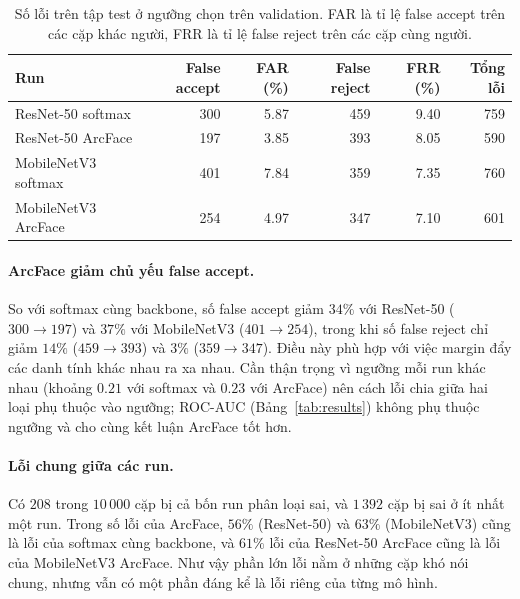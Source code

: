 \documentclass[a4paper,12pt]{article}
\begin{document}
\begin{table}[h]
    \centering
    \caption{Số lỗi trên tập test ở ngưỡng chọn trên validation. FAR là tỉ lệ false accept trên các cặp khác người, FRR là tỉ lệ false reject trên các cặp cùng người.}
    \label{tab:errors}
    \begin{tabular}{lrrrrr}
        \toprule
        Run                 & False accept & FAR (\%) & False reject & FRR (\%) & Tổng lỗi \\
        \midrule
        ResNet-50 softmax   & 300          & 5.87     & 459          & 9.40     & 759      \\
        ResNet-50 ArcFace   & 197          & 3.85     & 393          & 8.05     & 590      \\
        MobileNetV3 softmax & 401          & 7.84     & 359          & 7.35     & 760      \\
        MobileNetV3 ArcFace & 254          & 4.97     & 347          & 7.10     & 601      \\
        \bottomrule
    \end{tabular}
\end{table}

\paragraph{ArcFace giảm chủ yếu false accept.} So với softmax cùng backbone, số false accept giảm $34\%$ với ResNet-50 ($300 \to 197$) và $37\%$ với MobileNetV3 ($401 \to 254$), trong khi số false reject chỉ giảm $14\%$ ($459 \to 393$) và $3\%$ ($359 \to 347$). Điều này phù hợp với việc margin đẩy các danh tính khác nhau ra xa nhau. Cần thận trọng vì ngưỡng mỗi run khác nhau (khoảng $0.21$ với softmax và $0.23$ với ArcFace) nên cách lỗi chia giữa hai loại phụ thuộc vào ngưỡng; ROC-AUC (Bảng~\ref{tab:results}) không phụ thuộc ngưỡng và cho cùng kết luận ArcFace tốt hơn.

\paragraph{Lỗi chung giữa các run.} Có $208$ trong $10\,000$ cặp bị cả bốn run phân loại sai, và $1\,392$ cặp bị sai ở ít nhất một run. Trong số lỗi của ArcFace, $56\%$ (ResNet-50) và $63\%$ (MobileNetV3) cũng là lỗi của softmax cùng backbone, và $61\%$ lỗi của ResNet-50 ArcFace cũng là lỗi của MobileNetV3 ArcFace. Như vậy phần lớn lỗi nằm ở những cặp khó nói chung, nhưng vẫn có một phần đáng kể là lỗi riêng của từng mô hình.
\end{document}
